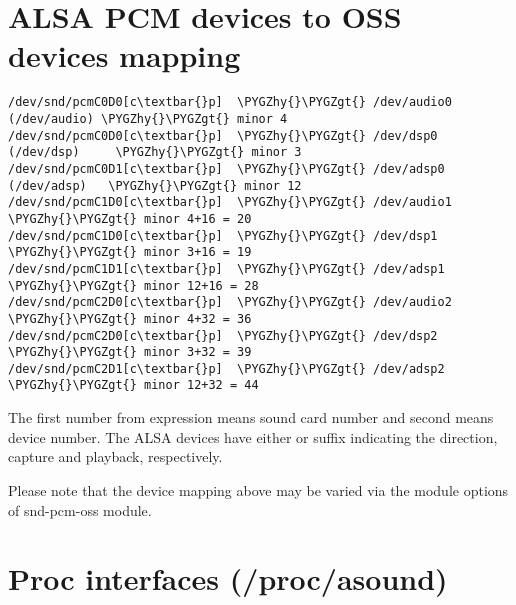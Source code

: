\documentclass[a4paper,8pt,english]{sphinxmanual}
\def\PYGZgt{\char`\>}
\def\PYGZhy{\char`\-}
\begin{document}
\section{ALSA PCM devices to OSS devices mapping}
\label{sound/alsa-configuration:alsa-pcm-devices-to-oss-devices-mapping}
\begin{Verbatim}[commandchars=\\\{\}]
/dev/snd/pcmC0D0[c\textbar{}p]  \PYGZhy{}\PYGZgt{} /dev/audio0 (/dev/audio) \PYGZhy{}\PYGZgt{} minor 4
/dev/snd/pcmC0D0[c\textbar{}p]  \PYGZhy{}\PYGZgt{} /dev/dsp0 (/dev/dsp)     \PYGZhy{}\PYGZgt{} minor 3
/dev/snd/pcmC0D1[c\textbar{}p]  \PYGZhy{}\PYGZgt{} /dev/adsp0 (/dev/adsp)   \PYGZhy{}\PYGZgt{} minor 12
/dev/snd/pcmC1D0[c\textbar{}p]  \PYGZhy{}\PYGZgt{} /dev/audio1              \PYGZhy{}\PYGZgt{} minor 4+16 = 20
/dev/snd/pcmC1D0[c\textbar{}p]  \PYGZhy{}\PYGZgt{} /dev/dsp1                \PYGZhy{}\PYGZgt{} minor 3+16 = 19
/dev/snd/pcmC1D1[c\textbar{}p]  \PYGZhy{}\PYGZgt{} /dev/adsp1               \PYGZhy{}\PYGZgt{} minor 12+16 = 28
/dev/snd/pcmC2D0[c\textbar{}p]  \PYGZhy{}\PYGZgt{} /dev/audio2              \PYGZhy{}\PYGZgt{} minor 4+32 = 36
/dev/snd/pcmC2D0[c\textbar{}p]  \PYGZhy{}\PYGZgt{} /dev/dsp2                \PYGZhy{}\PYGZgt{} minor 3+32 = 39
/dev/snd/pcmC2D1[c\textbar{}p]  \PYGZhy{}\PYGZgt{} /dev/adsp2               \PYGZhy{}\PYGZgt{} minor 12+32 = 44
\end{Verbatim}

The first number from  expression means
sound card number and second means device number.  The ALSA devices
have either  or  suffix indicating the direction, capture and
playback, respectively.

Please note that the device mapping above may be varied via the module
options of snd-pcm-oss module.


\section{Proc interfaces (/proc/asound)}
\label{sound/alsa-configuration:proc-interfaces-proc-asound}
\end{document}
